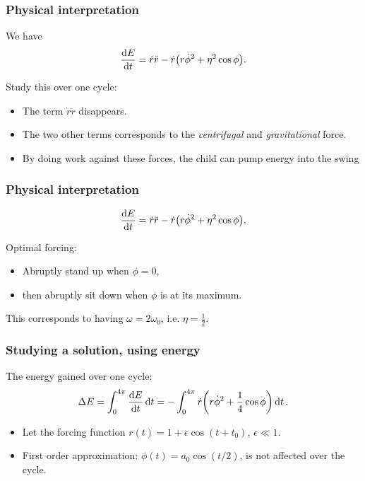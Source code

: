 \documentclass[swedish, english]{beamer}
\begin{document}
\begin{frame}
\frametitle{Physical interpretation}
We have 
\[
\dv{E}{t}
=\dot{r}\ddot{r} - \dot{r}\qty(r\dot{\phi}^2 + \eta^2\cos\phi).
\]
\vspace{11pt}

Study this over one cycle:
\begin{itemize}
\item The term $\dot{r}\ddot{r}$ disappears.
\item The two other terms corresponds to the \emph{centrifugal} and
\emph{gravitational} force.
\vspace{6pt}
\item By doing work against these forces, the child can pump energy
into the swing
\end{itemize}
\end{frame}

\begin{frame}
\frametitle{Physical interpretation}
\[
\dv{E}{t}
=\dot{r}\ddot{r} - \dot{r}\qty(r\dot{\phi}^2 + \eta^2\cos\phi).
\]

\vspace{11pt}
Optimal forcing:
\begin{itemize}
\item Abruptly stand up when $\phi=0$,
\item then abruptly sit down when $\phi$ is at its maximum.
\end{itemize}

This corresponds to having $\omega=2\omega_0$, i.e. $\eta=\frac{1}{2}$.

\end{frame}


\begin{frame}
\frametitle{Studying a solution, using energy}
The energy gained over one cycle:
\[
\Delta{E}=\int_0^{4\pi}\dv{E}{t}\dd{t}
= - \int_0^{4\pi}\dot{r}\qty(r\dot{\phi}^2 + \frac{1}{4}\cos\phi) \dd{t}.
\]
\vspace{6pt}

\begin{itemize}
\item Let the forcing function $r(t)=1+\epsilon\cos(t+t_0)$, \;\;$\epsilon\ll1$.
\item First order approximation: $\phi(t)=a_0\cos(t/2)$, is not
affected over the cycle.
\end{itemize}
\end{frame}
\end{document}
